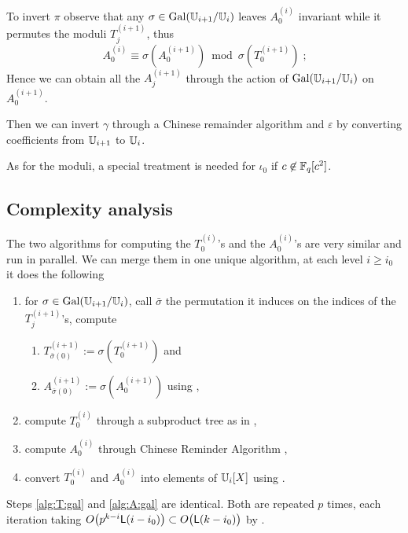 To invert $\pi$ observe that any $\sigma\in\operatorname{Gal}(\mathbb{U}_{i+1}/\mathbb{U}_i)$ leaves
$A_0^{(i)}$ invariant while it permutes the moduli $T_j^{(i+1)}$, thus
\begin{equation}
  A_0^{(i)} \equiv \sigma\left(A_0^{(i+1)}\right)
  \bmod \sigma\left(T_0^{(i+1)}\right)
  \;\text{;}
\end{equation}
Hence we can obtain all the $A_j^{(i+1)}$ through the action of
$\operatorname{Gal}(\mathbb{U}_{i+1}/\mathbb{U}_i)$ on $A_0^{(i+1)}$.

Then we can invert $\gamma$ through a Chinese remainder algorithm
\cite[$\S$10.3]{vzGG} and $\varepsilon$ by converting coefficients from
$\mathbb{U}_{i+1}$ to $\mathbb{U}_i$.

As for the moduli, a special treatment is needed for $\iota_0$ if
$c\not\in\mathbb{F}_q[c^2]$.


\subsection{Complexity analysis}
\label{sec:C2-AS-FI:complexity}

The two algorithms for computing the $T_{0}^{(i)}$'s and the
$A_{0}^{(i)}$'s are very similar and run in parallel. We can merge
them in one unique algorithm, at each level $i\ge i_0$ it does the
following

\begin{enumerate}
\item for $\sigma \in \operatorname{Gal}(\mathbb{U}_{i+1}/\mathbb{U}_i)$, call $\bar\sigma$ the
  permutation it induces on the indices of the $T_j^{(i+1)}$'s,
  compute
  \begin{enumerate}
  \item\label{alg:T:gal} $T_{\bar\sigma(0)}^{(i+1)} :=
    \sigma\left(T_0^{(i+1)}\right)$ and
  \item\label{alg:A:gal} $A_{\bar\sigma(0)}^{(i+1)} :=
    \sigma\left(A_0^{(i+1)}\right)$ using
    \cite[]{DFS09},
  \end{enumerate}
\item\label{alg:T:prod} compute $T_0^{(i)}$ through a subproduct tree
  as in \cite[Algo. 10.3]{vzGG},
\item\label{alg:A:CRA} compute $A_0^{(i)}$ through Chinese Reminder
  Algorithm \cite[Algo. 10.16]{vzGG},
\item\label{alg:T:push} convert $T_0^{(i)}$ and $A_0^{(i)}$ into
  elements of $\mathbb{U}_i[X]$ using \cite[]{DFS09}.
\end{enumerate}

Steps \ref{alg:T:gal} and \ref{alg:A:gal} are identical. Both are
repeated $p$ times, each iteration taking $O\bigl(p^{k-i}{\sf
  L}(i-i_0)\bigr) \subset O\bigl({\sf L}(k-i_0)\bigr)$ by
\cite[Th. 17]{DFS09}.

